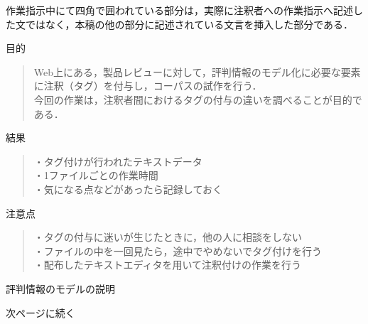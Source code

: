\documentclass[japanese]{jnlp_1.4}
\begin{document}
作業指示中にて四角で囲われている部分は，実際に注釈者への作業指示へ記述した文ではなく，本稿の他の部分に記述されている文言を挿入した部分である．
\begin{screen}
目的
\begin{quote}
Web上にある，製品レビューに対して，評判情報のモデル化に必要な要素に注釈（タグ）を付与し，コーパスの試作を行う．\\
今回の作業は，注釈者間におけるタグの付与の違いを調べることが目的である．
\end{quote}
結果
\begin{quote}
・タグ付けが行われたテキストデータ\\
・1ファイルごとの作業時間\\
・気になる点などがあったら記録しておく
\end{quote}
注意点
\begin{quote}
・タグの付与に迷いが生じたときに，他の人に相談をしない\\
・ファイルの中を一回見たら，途中でやめないでタグ付けを行う\\
・配布したテキストエディタを用いて注釈付けの作業を行う
\end{quote}
評判情報のモデルの説明
\begin{quote}
\end{quote}
\end{screen}
次ページに続く
\end{document}
